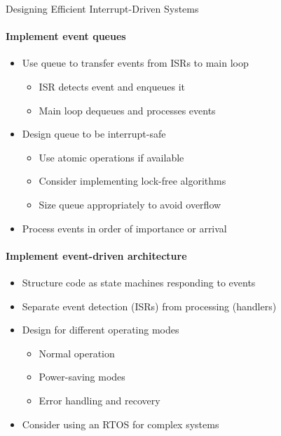 \begin{KR}{Designing Efficient Interrupt-Driven Systems}
\paragraph{Implement event queues}
\begin{itemize}
    \item Use queue to transfer events from ISRs to main loop
    \begin{itemize}
        \item ISR detects event and enqueues it
        \item Main loop dequeues and processes events
    \end{itemize}
    \item Design queue to be interrupt-safe
    \begin{itemize}
        \item Use atomic operations if available
        \item Consider implementing lock-free algorithms
        \item Size queue appropriately to avoid overflow
    \end{itemize}
    \item Process events in order of importance or arrival
\end{itemize}

\paragraph{Implement event-driven architecture}
\begin{itemize}
    \item Structure code as state machines responding to events
    \item Separate event detection (ISRs) from processing (handlers)
    \item Design for different operating modes
    \begin{itemize}
        \item Normal operation
        \item Power-saving modes
        \item Error handling and recovery
    \end{itemize}
    \item Consider using an RTOS for complex systems
\end{itemize}
\end{KR}



\raggedcolumns
\pagebreak
















